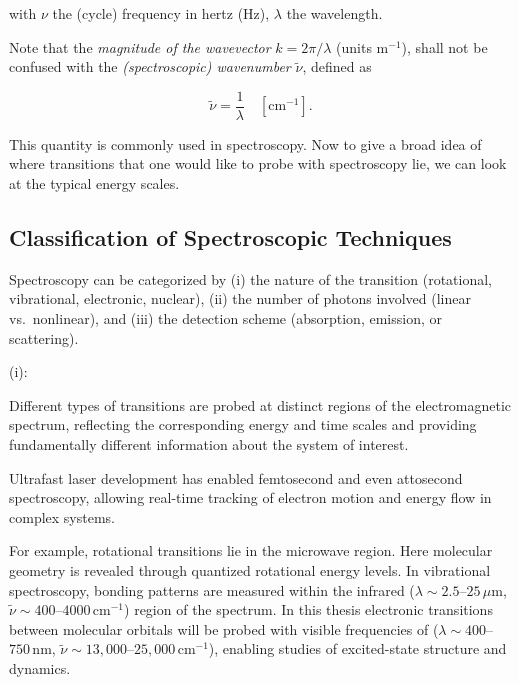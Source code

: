 \noindent 
with $\nu$ the (cycle) frequency in hertz (Hz), $\lambda$ the wavelength. 

\noindent 
Note that the \emph{magnitude of the wavevector } $k = 2\pi/\lambda$ (units m$^{-1}$), shall not be confused with the \emph{(spectroscopic) wavenumber} $\tilde{\nu}$, defined as

\begin{equation}
	\tilde{\nu} = \frac{1}{\lambda} \quad [\mathrm{cm}^{-1}].
	\label{eq:wavenumber_definition}
\end{equation}

This quantity is commonly used in spectroscopy. %
Now to give a broad idea of where transitions that one would like to probe with spectroscopy lie, we can look at the typical energy scales.

\subsection{Classification of Spectroscopic Techniques}
\label{subsec:classification_techniques}

\noindent
Spectroscopy can be categorized by (i) the nature of the transition (rotational, vibrational, electronic, nuclear), (ii) the number of photons involved (linear vs.\ nonlinear), and (iii) the detection scheme (absorption, emission, or scattering). 

\noindent
(i):

\noindent
Different types of transitions are probed at distinct regions of the electromagnetic spectrum, reflecting the corresponding energy and time scales and providing fundamentally different information about the system of interest. 

\noindent
Ultrafast laser development has enabled femtosecond and even attosecond spectroscopy, allowing real-time tracking of electron motion and energy flow in complex systems.

\noindent
For example, rotational transitions lie in the microwave region. Here molecular geometry is revealed through quantized rotational energy levels. In vibrational spectroscopy, bonding patterns are measured within the infrared ($\lambda\!\sim\!2.5$–$25\,\mu\mathrm{m}$, $\tilde{\nu}\!\sim\!400$–$4000\,\mathrm{cm^{-1}}$) region of the spectrum. In this thesis electronic transitions between molecular orbitals will be probed with visible frequencies of  ($\lambda\!\sim\!400$–$750\,\mathrm{nm}$, $\tilde{\nu}\!\sim\!13{,}000$–$25{,}000\,\mathrm{cm^{-1}}$), enabling studies of excited-state structure and dynamics.

